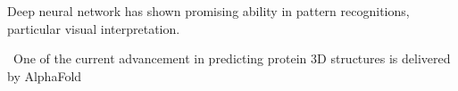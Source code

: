 Deep neural network has shown promising ability in pattern recognitions, particular visual interpretation.
\par 
\
One of the current advancement in predicting protein 3D structures is delivered by AlphaFold